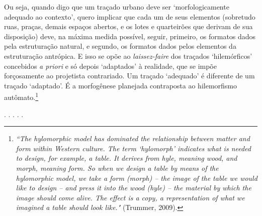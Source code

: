 \documentclass[]{report}
\begin{document}
	Ou seja, quando digo que um traçado urbano deve ser `morfologicamente adequado ao contexto', quero implicar que cada um de seus elementos (sobretudo ruas, praças, demais espaços abertos, e os lotes e quarteirões que derivam de sua disposição) deve, na máxima medida possível, seguir, primeiro, os formatos dados pela estruturação natural, e segundo, os formatos dados pelos elementos da estruturação antrópica. E isso se opõe ao \textit{laissez-faire} dos traçados `hilemórficos' concebidos \textit{a priori} e só depois `adaptados' à realidade, que se impõe forçosamente ao projetista contrariado. Um traçado `adequado' é diferente de um traçado `adaptado'. É a morfogênese planejada contraposta ao hilemorfismo autômato.\footnote[1]{\textit{``The hylomorphic model has dominated the relationship between matter and form within Western culture. The term ‘hylomorph’ indicates what is needed to design, for example, a table. It derives from \textnormal{hyle}, meaning wood, and morph, meaning form. So when we design a table by means of the hylomorphic model, we take a form \textnormal{(morph)} – the image of the table we would like to design – and press it into the wood \textnormal{(hyle)} – the material by which the image should come alive. The effect is a copy, a representation of what we imagined a table should look like."} (Trummer, 2009).}
	
	\begin{center}
		. . . . .
	\end{center}


	
\end{document}

